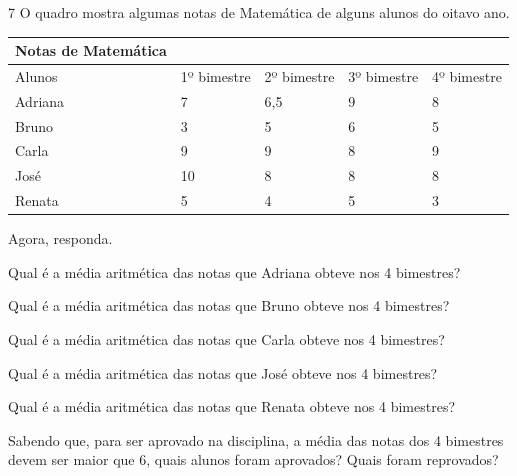 \pagebreak

\num{7} O quadro mostra algumas notas de Matemática de alguns alunos do oitavo ano.


\begin{longtable}[]{@{}lllll@{}}
\toprule
Notas de Matemática & & & &\tabularnewline
\midrule
\endhead
Alunos & 1º bimestre & 2º bimestre & 3º bimestre & 4º bimestre\tabularnewline
Adriana & 7 & 6,5 & 9 & 8\tabularnewline
Bruno & 3 & 5 & 6 & 5\tabularnewline
Carla & 9 & 9 & 8 & 9\tabularnewline
José & 10 & 8 & 8 & 8\tabularnewline
Renata & 5 & 4 & 5 & 3\tabularnewline
\bottomrule
\end{longtable}

Agora, responda.

\begin{escolha}
\item Qual é a média aritmética das notas que Adriana obteve nos 4
bimestres?\\

\item Qual é a média aritmética das notas que Bruno obteve nos 4 bimestres?\\

\item Qual é a média aritmética das notas que Carla obteve nos 4 bimestres?\\

\item Qual é a média aritmética das notas que José obteve nos 4 bimestres?\\

\item Qual é a média aritmética das notas que Renata obteve nos 4
bimestres?\\

\item Sabendo que, para ser aprovado na disciplina, a média das notas dos 4
bimestres devem ser maior que 6, quais alunos foram aprovados? Quais
foram reprovados?\\

\end{escolha}








